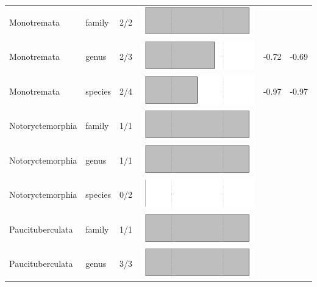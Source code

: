 \begin{longtable}{lL{1.8cm}C{2cm}lcc}
  Monotremata & family & 2/2 & \includegraphics[width=0.20\linewidth, height=0.05\linewidth]{Supplementaries/Figures/Chapter2/Results_1c/Table_figures/bar43.pdf} &   &   \\ 
  Monotremata & genus & 2/3 & \includegraphics[width=0.20\linewidth, height=0.05\linewidth]{Supplementaries/Figures/Chapter2/Results_1c/Table_figures/bar44.pdf} & -0.72 & -0.69 \\ 
  Monotremata & species & 2/4 & \includegraphics[width=0.20\linewidth, height=0.05\linewidth]{Supplementaries/Figures/Chapter2/Results_1c/Table_figures/bar45.pdf} & -0.97 & -0.97 \\ 
  Notoryctemorphia & family & 1/1 & \includegraphics[width=0.20\linewidth, height=0.05\linewidth]{Supplementaries/Figures/Chapter2/Results_1c/Table_figures/bar46.pdf} &   &   \\ 
  Notoryctemorphia & genus & 1/1 & \includegraphics[width=0.20\linewidth, height=0.05\linewidth]{Supplementaries/Figures/Chapter2/Results_1c/Table_figures/bar47.pdf} &   &   \\ 
  Notoryctemorphia & species & 0/2 & \includegraphics[width=0.20\linewidth, height=0.05\linewidth]{Supplementaries/Figures/Chapter2/Results_1c/Table_figures/bar48.pdf} &   &   \\ 
  Paucituberculata & family & 1/1 & \includegraphics[width=0.20\linewidth, height=0.05\linewidth]{Supplementaries/Figures/Chapter2/Results_1c/Table_figures/bar49.pdf} &   &   \\ 
  Paucituberculata & genus & 3/3 & \includegraphics[width=0.20\linewidth, height=0.05\linewidth]{Supplementaries/Figures/Chapter2/Results_1c/Table_figures/bar50.pdf} &   &   \\ 

\end{longtable}

